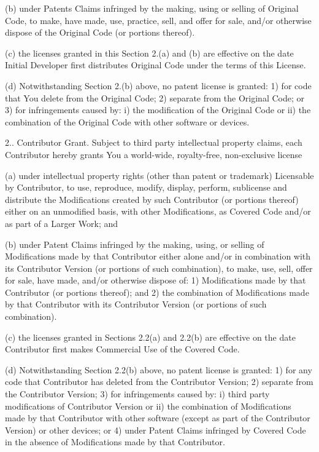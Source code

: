 \begin{DoxyEnumerate}
(b) under Patents Claims infringed by the making, using or selling of Original Code, to make, have made, use, practice, sell, and offer for sale, and/or otherwise dispose of the Original Code (or portions thereof).

(c) the licenses granted in this Section 2.(a) and (b) are effective on the date Initial Developer first distributes Original Code under the terms of this License.

(d) Notwithstanding Section 2.(b) above, no patent license is granted\-: 1) for code that You delete from the Original Code; 2) separate from the Original Code; or 3) for infringements caused by\-: i) the modification of the Original Code or ii) the combination of the Original Code with other software or devices.

2.. Contributor Grant. Subject to third party intellectual property claims, each Contributor hereby grants You a world-\/wide, royalty-\/free, non-\/exclusive license \begin{DoxyVerb} (a)  under intellectual property rights (other than patent or
 trademark) Licensable by Contributor, to use, reproduce, modify,
 display, perform, sublicense and distribute the Modifications
 created by such Contributor (or portions thereof) either on an
 unmodified basis, with other Modifications, as Covered Code
 and/or as part of a Larger Work; and

 (b) under Patent Claims infringed by the making, using, or
 selling of  Modifications made by that Contributor either alone
 and/or in combination with its Contributor Version (or portions
 of such combination), to make, use, sell, offer for sale, have
 made, and/or otherwise dispose of: 1) Modifications made by that
 Contributor (or portions thereof); and 2) the combination of
 Modifications made by that Contributor with its Contributor
 Version (or portions of such combination).

 (c) the licenses granted in Sections 2.2(a) and 2.2(b) are
 effective on the date Contributor first makes Commercial Use of
 the Covered Code.

 (d)    Notwithstanding Section 2.2(b) above, no patent license is
 granted: 1) for any code that Contributor has deleted from the
 Contributor Version; 2)  separate from the Contributor Version;
 3)  for infringements caused by: i) third party modifications of
 Contributor Version or ii)  the combination of Modifications made
 by that Contributor with other software  (except as part of the
 Contributor Version) or other devices; or 4) under Patent Claims
 infringed by Covered Code in the absence of Modifications made by
 that Contributor.
\end{DoxyVerb}


\end{DoxyEnumerate}
